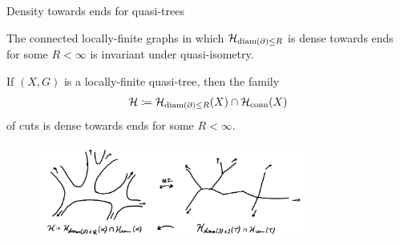\documentclass{beamer}
\begin{document}
    \begin{frame}{Density towards ends for quasi-trees}
        \small{
            \begin{lemma}
                The connected locally-finite graphs in which $\mathcal{H}_{\operatorname{diam}(\partial)\leq R}$ is dense towards ends for some $R<\infty$ is invariant under quasi-isometry.
            \end{lemma}

            \vspace{-0.1in}

            \begin{corollary}
                If $(X,G)$ is a locally-finite quasi-tree, then the family
                \vspace{-0.1in}
                \begin{equation*}
                    \mc{H}\coloneqq\mc{H}_{\diam(\del)\leq R}(X)\cap\mc{H}_{\mathrm{conn}}(X)
                    \vspace{-0.1in}
                \end{equation*}
                of cuts is dense towards ends for some $R<\infty$.
            \end{corollary}
            
            \vspace{-0.175in}

            \begin{figure}[h]
                \center
                \includegraphics[width=0.8\textwidth]{img/tree_quasi_tree.png}
            \end{figure}
        }
    \end{frame}
\end{document}

